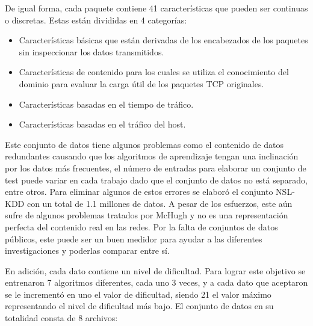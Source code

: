 De igual forma, cada paquete contiene 41 características que pueden ser continuas o discretas. Estas están divididas en 4 categorías:

\begin{itemize}
    \item Características básicas que están derivadas de los encabezados de los paquetes sin inspeccionar los datos transmitidos.
    \item Características de contenido para los cuales se utiliza el conocimiento del dominio para evaluar la carga útil de los paquetes TCP originales.
    \item Características basadas en el tiempo de tráfico.
    \item Características basadas en el tráfico del host.
\end{itemize}

Este conjunto de datos tiene algunos problemas como el contenido de datos redundantes causando que los algoritmos de aprendizaje tengan una inclinación por los datos más frecuentes, el número de entradas para elaborar un conjunto de test puede variar en cada trabajo dado que el conjunto de datos no está separado, entre otros. Para eliminar algunos de estos errores se elaboró el conjunto NSL-KDD con un total de 1.1 millones de datos. A pesar de los esfuerzos, este aún sufre de algunos problemas tratados por McHugh \cite{mchugh2000testing} y no es una representación perfecta del contenido real en las redes. Por la falta de conjuntos de datos públicos, este puede ser un buen medidor para ayudar a las diferentes investigaciones y poderlas comparar entre sí. 

En adición, cada dato contiene un nivel de dificultad. Para lograr este objetivo se entrenaron 7 algoritmos diferentes, cada uno 3 veces, y a cada dato que aceptaron se le incrementó en uno el valor de dificultad, siendo 21 el valor máximo representando el nivel de dificultad más bajo. El conjunto de datos en su totalidad consta de 8 archivos:

